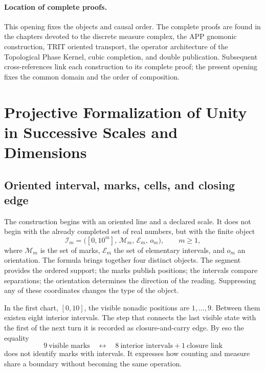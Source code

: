 \paragraph{Location of complete proofs.}
This opening fixes the objects and causal order. The complete proofs are found in the chapters devoted to the discrete measure complex, the APP gnomonic construction, TRIT oriented transport, the operator architecture of the Topological Phase Kernel, cubic completion, and double publication. Subsequent cross-references link each construction to its complete proof; the present opening fixes the common domain and the order of composition.


\section{Projective Formalization of Unity in Successive Scales and Dimensions}
\label{p12-83-c0-s2:chap:ampliacion-conservacion-unidad}

\subsection{Oriented interval, marks, cells, and closing edge}

The construction begins with an oriented line and a declared scale. It does not
begin with the already completed set of real numbers, but with the
finite object
\begin{equation}\label{p12-83-c0-s2:eq:amp-recta-k}
 \mathcal I_m=\bigl([0,10^m],\,\mathcal M_m,\,\mathcal E_m,\,o_m\bigr),
 \qquad m\geq1,
\end{equation}
where \(\mathcal M_m\) is the set of marks, \(\mathcal E_m\) the set of
elementary intervals, and \(o_m\) an orientation. The formula brings together four
distinct objects. The segment provides the ordered support; the marks
publish positions; the intervals compare separations; the orientation
determines the direction of the reading. Suppressing any of these coordinates
changes the type of the object.

In the first chart, \([0,10]\), the visible nonadic positions are
\(1,\ldots,9\). Between them existen eight interior intervals. The step that
connects the last visible state with the first of the next turn it
is recorded as closure-and-carry edge. By eso the equality
\begin{equation}\label{p12-83-c0-s2:eq:amp-nueve-marcas-ocho-intervalos}
 9\ \text{visible marks}
 \quad\longleftrightarrow\quad
 8\ \text{interior intervals}+1\ \text{closure link}
\end{equation}
does not identify marks with intervals. It expresses how counting and measure
share a boundary without becoming the same operation.

